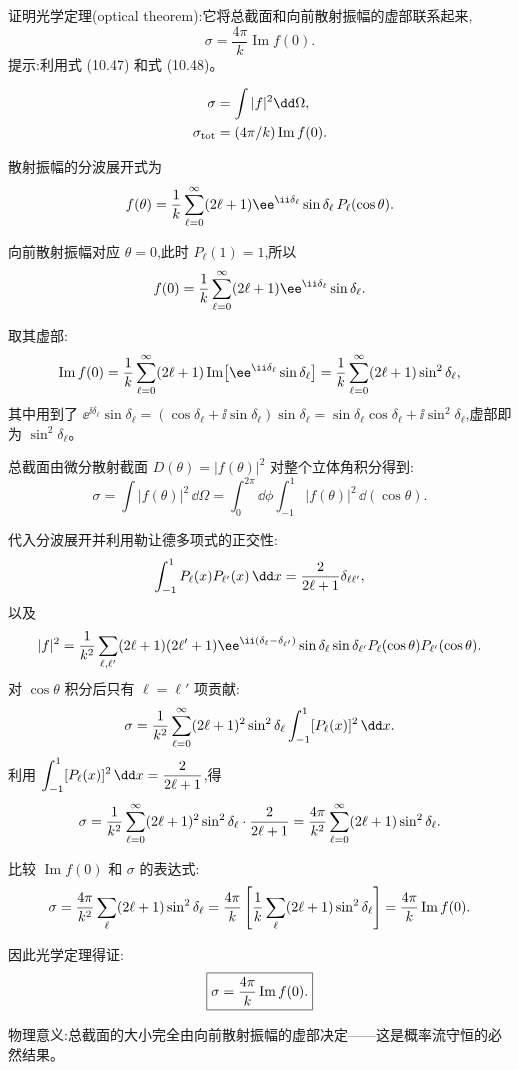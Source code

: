 \begin{question}
证明光学定理(optical theorem):它将总截面和向前散射振幅的虚部联系起来,
\[
\sigma=\frac{4\pi}{k}\operatorname{Im} f(0).
\]
提示:利用式 (10.47) 和式 (10.48)。

\par\smallskip
{}\[\begin{aligned}\sigma&=\int|f|^2\dd\Omega,\\\sigma_{\rm tot}&=(4\pi/k)\operatorname{Im}f(0).\end{aligned}\]

\begin{solution}
散射振幅的分波展开式为
\[
f(\theta)={1\over k}\sum_{\ell=0}^{\infty}(2\ell+1)\ee^{\ii\delta_\ell}\sin\delta_\ell\,P_\ell(\cos\theta).
\]

向前散射振幅对应 $\theta=0$,此时 $P_\ell(1)=1$,所以
\[
f(0)={1\over k}\sum_{\ell=0}^{\infty}(2\ell+1)\ee^{\ii\delta_\ell}\sin\delta_\ell.
\]

取其虚部:
\[
\operatorname{Im}f(0)={1\over k}\sum_{\ell=0}^{\infty}(2\ell+1)\operatorname{Im}\bigl[\ee^{\ii\delta_\ell}\sin\delta_\ell\bigr]
={1\over k}\sum_{\ell=0}^{\infty}(2\ell+1)\sin^2\delta_\ell,
\]
其中用到了 $\ee^{\ii\delta_\ell}\sin\delta_\ell=(\cos\delta_\ell+\ii\sin\delta_\ell)\sin\delta_\ell=\sin\delta_\ell\cos\delta_\ell+\ii\sin^2\delta_\ell$,虚部即为 $\sin^2\delta_\ell$。

总截面由微分散射截面 $D(\theta)=|f(\theta)|^2$ 对整个立体角积分得到:
\[
\sigma=\int|f(\theta)|^2\,\dd\Omega
=\int_0^{2\pi}\dd\phi\int_{-1}^{1}|f(\theta)|^2\,\dd(\cos\theta).
\]

代入分波展开并利用勒让德多项式的正交性:
\[
\int_{-1}^{1}P_\ell(x)P_{\ell'}(x)\,\dd x={2\over2\ell+1}\delta_{\ell\ell'},
\]
以及
\[
|f|^2={1\over k^2}\sum_{\ell,\ell'}(2\ell+1)(2\ell'+1)\ee^{\ii(\delta_\ell-\delta_{\ell'})}\sin\delta_\ell\sin\delta_{\ell'}P_\ell(\cos\theta)P_{\ell'}(\cos\theta).
\]
对 $\cos\theta$ 积分后只有 $\ell=\ell'$ 项贡献:
\[
\sigma={1\over k^2}\sum_{\ell=0}^{\infty}(2\ell+1)^2\sin^2\delta_\ell\int_{-1}^{1}[P_\ell(x)]^2\,\dd x.
\]
利用 $\displaystyle\int_{-1}^{1}[P_\ell(x)]^2\,\dd x={2\over2\ell+1}$,得
\[
\sigma={1\over k^2}\sum_{\ell=0}^{\infty}(2\ell+1)^2\sin^2\delta_\ell\cdot{2\over2\ell+1}
={4\pi\over k^2}\sum_{\ell=0}^{\infty}(2\ell+1)\sin^2\delta_\ell.
\]

比较 $\operatorname{Im}f(0)$ 和 $\sigma$ 的表达式:
\[
\sigma={4\pi\over k^2}\sum_{\ell}(2\ell+1)\sin^2\delta_\ell
={4\pi\over k}\left[{1\over k}\sum_{\ell}(2\ell+1)\sin^2\delta_\ell\right]
={4\pi\over k}\operatorname{Im}f(0).
\]

因此光学定理得证:
\[
\boxed{\sigma={4\pi\over k}\operatorname{Im}f(0).}
\]

物理意义:总截面的大小完全由向前散射振幅的虚部决定——这是概率流守恒的必然结果。
\end{solution}
\end{question}

